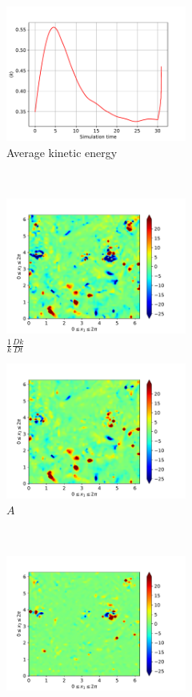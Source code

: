 \begin{figure}[H]
    \begin{subfigure}[H]{0.45\textwidth}
        \includegraphics[height=1.75in]{media/run-cds-65/ke-average1420}
        \caption{Average kinetic energy}
    \end{subfigure}
    ~
    \begin{subfigure}[H]{0.45\textwidth}
        \includegraphics[height=1.75in]{media/run-cds-65/ke-1420}
        \caption{$\frac{1}{k} \frac{D k}{Dt}$}
    \end{subfigure}
    \newline
    \begin{subfigure}{0.45\textwidth}
        \includegraphics[height=1.75in]{media/run-cds-65/A-ke-1420}
        \caption{$A$}
    \end{subfigure}
    ~
    \begin{subfigure}{0.45\textwidth}
        \includegraphics[height=1.75in]{media/run-cds-65/C-ke-1420}

\end{subfigure}
\end{figure}
